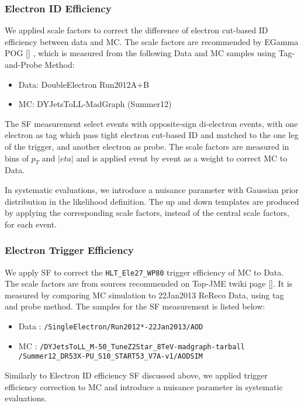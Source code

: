 \documentclass{cmspaperpdf}
\begin{document}
\subsubsection{Electron ID Efficiency}
We applied scale factors to correct the difference of electron cut-based ID efficiency between data and MC. The scale factors are recommended by EGamma POG [] , which is measured from the following Data and MC samples using Tag-and-Probe Method:
\begin{itemize}
\item Data: DoubleElectron Run2012A+B
\item MC: DYJetsToLL-MadGraph (Summer12)
\end{itemize}
The SF measurement select events with opposite-sign di-electron events, with one electron as tag which pass tight electron cut-based ID and matched to the one leg of the trigger, and another electron as probe. The scale factors are measured in bins of $p_T$ and $|eta|$ and is applied event by event as a weight to correct MC to Data.

In systematic evaluations, we introduce a nuisance parameter with Gaussian prior distribution in the likelihood definition. The up and down templates are produced by applying the corresponding scale factors, instead of the central scale factors, for each event. 

\subsubsection{Electron Trigger Efficiency}
We apply SF to correct the \texttt{HLT\_Ele27\_WP80} trigger efficiency of MC to Data. The scale factors are from sources recommended on Top-JME twiki page []. It is measured by comparing MC simulation to 22Jan2013 ReReco Data, using tag and probe method. The samples for the SF measurement is listed below:
\begin{itemize}
\item Data : \texttt{/SingleElectron/Run2012*-22Jan2013/AOD}
\item MC : \texttt{/DYJetsToLL\_M-50\_TuneZ2Star\_8TeV-madgraph-tarball \\
           /Summer12\_DR53X-PU\_S10\_START53\_V7A-v1/AODSIM}
\end{itemize}

Similarly to Electron ID efficiency SF discussed above, we applied trigger efficiency correction to MC and introduce a nuisance parameter in systematic evaluations. 
\end{document}

